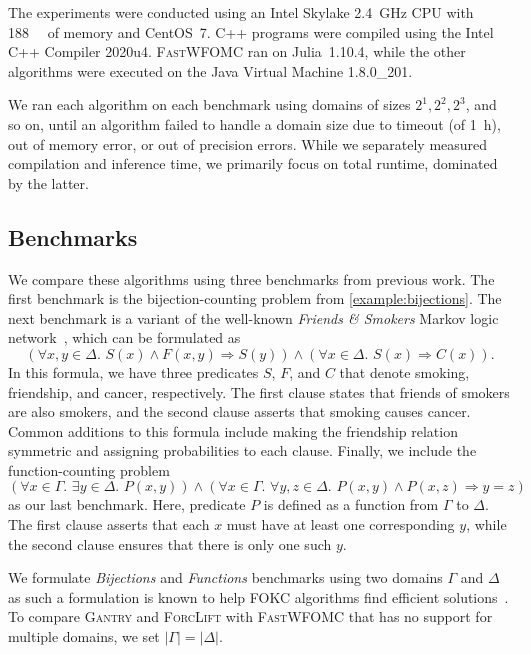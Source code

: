 \documentclass[a4paper,UKenglish,cleveref, autoref, thm-restate]{lipics-v2021}
\newcommand{\Cranetwo}{\textsc{Gantry}}
\newcommand{\friends}{\emph{Friends \& Smokers}}
\newcommand{\functions}{\emph{Functions}}
\newcommand{\bijections}{\emph{Bijections}}
\begin{document}
The experiments were conducted using an Intel Skylake \SI{2.4}{\giga\hertz} CPU
with \SI{188}{\gibi\byte} of memory and CentOS~7. C++ programs were compiled
using the Intel C++ Compiler 2020u4. \textsc{FastWFOMC} ran on Julia~1.10.4,
while the other algorithms were executed on the Java Virtual Machine 1.8.0\_201.

We ran each algorithm on each benchmark using domains of sizes
$2^{1}, 2^{2}, 2^{3}$, and so on, until an algorithm failed to handle a domain
size due to timeout (of \SI{1}{\hour}), out of memory error, or out of precision
errors. While we separately measured compilation and inference time, we
primarily focus on total runtime, dominated by the latter.

\subsection{Benchmarks}

We compare these algorithms using three benchmarks from previous work. The first
benchmark is the bijection-counting problem from \cref{example:bijections}. The
next benchmark is a variant of the well-known \friends{} Markov logic
network~\cite{DBLP:conf/aaai/SinglaD08,DBLP:conf/uai/BroeckCD12}, which can be
formulated as
\[
  (\forall x,y \in \Delta\text{.
  } S(x) \land F(x, y) \Rightarrow S(y)) \land (\forall x \in \Delta\text{.
  }S(x) \Rightarrow C(x)).
\]
In this formula, we have three predicates $S$, $F$, and $C$ that denote smoking,
friendship, and cancer, respectively. The first clause states that friends of
smokers are also smokers, and the second clause asserts that smoking causes
cancer. Common additions to this formula include making the friendship relation
symmetric and assigning probabilities to each clause. Finally, we include the
function-counting problem~\cite{DBLP:conf/kr/DilkasB23}
\[
  (\forall x \in \Gamma\text{. }\exists y \in \Delta\text{.
  }P(x, y)) \land (\forall x \in \Gamma\text{. }\forall y, z \in \Delta\text{.
  }P(x, y) \land P(x, z) \Rightarrow y = z)
\]
as our last benchmark. Here, predicate $P$ is defined as a function from
$\Gamma$ to $\Delta$. The first clause asserts that each $x$ must have at least
one corresponding $y$, while the second clause ensures that there is only one
such $y$.

\begin{remark*}
  We formulate \bijections{} and \functions{} benchmarks using two domains
  $\Gamma$ and $\Delta$ as such a formulation is known to help FOKC algorithms
  find efficient solutions~\cite{DBLP:conf/kr/DilkasB23}. To compare \Cranetwo{}
  and \textsc{ForcLift} with \textsc{FastWFOMC} that has no support for multiple
  domains, we set $|\Gamma| = |\Delta|$.
\end{remark*}
\end{document}
